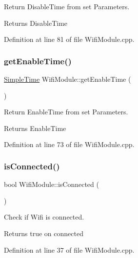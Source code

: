 Return Disable\+Time from set Parameters. \begin{DoxyReturn}{Returns}
Disable\+Time 
\end{DoxyReturn}


Definition at line 81 of file Wifi\+Module.\+cpp.

\mbox{\label{class_wifi_module_a1082a8799fe84e825520a61ee048da46}} 
\subsubsection{\texorpdfstring{getEnableTime()}{getEnableTime()}}
{\footnotesize\ttfamily \mbox{\hyperlink{class_simple_time}{Simple\+Time}} Wifi\+Module\+::get\+Enable\+Time (\begin{DoxyParamCaption}{ }\end{DoxyParamCaption})}

Return Enable\+Time from set Parameters. \begin{DoxyReturn}{Returns}
Enable\+Time 
\end{DoxyReturn}


Definition at line 73 of file Wifi\+Module.\+cpp.

\mbox{\label{class_wifi_module_a0f9b83f8ed9714183df33e055323261f}} 
\subsubsection{\texorpdfstring{isConnected()}{isConnected()}}
{\footnotesize\ttfamily bool Wifi\+Module\+::is\+Connected (\begin{DoxyParamCaption}{ }\end{DoxyParamCaption})}

Check if Wifi is connected. \begin{DoxyReturn}{Returns}
true on connected 
\end{DoxyReturn}


Definition at line 37 of file Wifi\+Module.\+cpp.

\mbox{\label{class_wifi_module_af03089b54800669d9cc57d3ac8bf3188}} 
